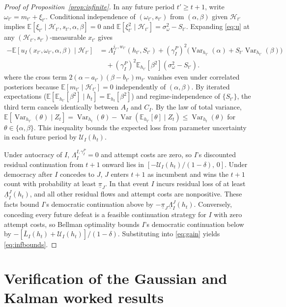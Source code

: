 \documentclass[11pt,letterpaper]{article}
\newcommand{\E}{\mathbb E}
\newcommand{\Var}{\operatorname{Var}}
\begin{document}
\begin{proof}[Proof of Proposition~\ref{prop:infinite}]
In any future period $t'\ge t+1$, write $\omega_{t'}=m_{t'}+\xi_{t'}$. Conditional independence of $(\omega_{t'},s_{t'})$ from $(\alpha,\beta)$ given $\mathcal H_{t'}$ implies $\E[\xi_{t'}\mid\mathcal H_{t'},s_{t'},\alpha,\beta]=0$ and $\E[\xi_{t'}^2\mid\mathcal H_{t'}]=\sigma_\omega^2-S_{t'}$. Expanding \eqref{eq:u} at any $(\mathcal H_{t'},s_{t'})$-measurable $x_{t'}$ gives
\[
\begin{aligned}
-\E[u_I(x_{t'},\omega_{t'},\alpha,\beta)\mid\mathcal H_{t'}]
 &=\Lambda_I^{j_{t'},w_{t'}}(h_{t'},S_{t'})
   +(\gamma_I^P)^2\big(\Var_{h_{t'}}(\alpha)+S_{t'}\Var_{h_{t'}}(\beta)\big)\\
 &\quad+(\gamma_I^P)^2\E_{h_{t'}}[\beta^2](\sigma_\omega^2-S_{t'}).
\end{aligned}
\]
where the cross term $2(\alpha-a_{t'})(\beta-b_{t'})m_{t'}$ vanishes even under correlated posteriors because $\E[m_{t'}\mid\mathcal H_{t'}]=0$ independently of $(\alpha,\beta)$. By iterated expectations ($\E[\E_{h_{t'}}[\beta^2]\mid h_t]=\E_{h_t}[\beta^2]$) and regime-independence of $\{S_{t'}\}$, the third term cancels identically between $A_I$ and $C_I$. By the law of total variance, $\E[\Var_{h_{t'}}(\theta)\mid Z_t]=\Var_{h_t}(\theta)-\Var(\E_{h_{t'}}[\theta]\mid Z_t)\le\Var_{h_t}(\theta)$ for $\theta\in\{\alpha,\beta\}$. This inequality bounds the expected loss from parameter uncertainty in each future period by $\mathcal U_I(h_t)$.

Under autocracy of $I$, $\Lambda_I^{I,\gamma_I^P}=0$ and attempt costs are zero, so $I$'s discounted residual continuation from $t+1$ onward lies in $[-\mathcal U_I(h_t)/(1-\delta),\,0]$. Under democracy after $I$ concedes to $J$, $J$ enters $t+1$ as incumbent and wins the $t+1$ count with probability at least $\underline\pi_J$. In that event $I$ incurs residual loss of at least $\underline\Lambda_I^J(h_t)$, and all other residual flows and attempt costs are nonpositive. These facts bound $I$'s democratic continuation above by $-\underline\pi_J\underline\Lambda_I^J(h_t)$. Conversely, conceding every future defeat is a feasible continuation strategy for $I$ with zero attempt costs, so Bellman optimality bounds $I$'s democratic continuation below by $-[\bar L_I(h_t)+\mathcal U_I(h_t)]/(1-\delta)$. Substituting into \eqref{eq:gain} yields \eqref{eq:infbounds}.
\end{proof}

\section{Verification of the Gaussian and Kalman worked results}\label{app:stationary}
\end{document}
